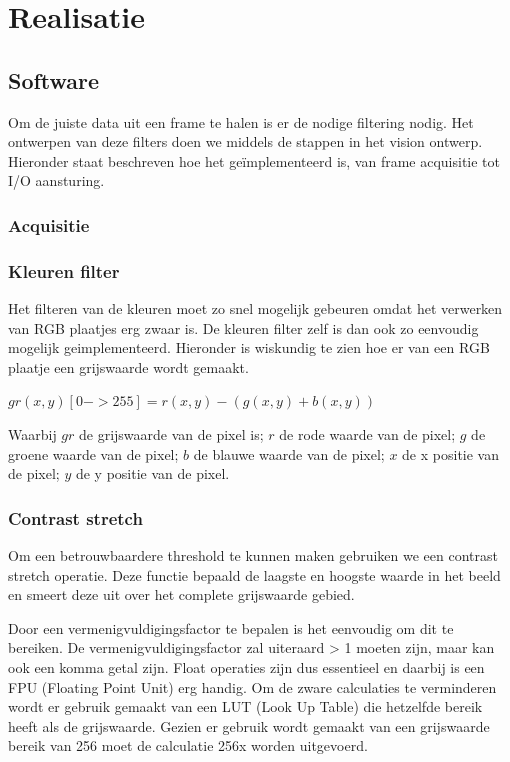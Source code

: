 \chapter{Realisatie}


\section{Software}
\label{sec:softreal}
Om de juiste data uit een frame te halen is er de nodige filtering nodig.
Het ontwerpen van deze filters doen we middels de stappen in het vision ontwerp.
Hieronder staat beschreven hoe het geïmplementeerd is, van frame acquisitie tot
I/O aansturing.

\subsection{Acquisitie}
\label{sub:acqreal}

\subsection{Kleuren filter}
\label{sub:kleurfilt}
Het filteren van de kleuren moet zo snel mogelijk gebeuren omdat het verwerken van 
RGB plaatjes erg zwaar is. De kleuren filter zelf is dan ook zo eenvoudig mogelijk 
geimplementeerd. Hieronder is wiskundig te zien hoe er van een RGB plaatje een 
grijswaarde wordt gemaakt.

$gr(x, y)[0 -> 255] = r(x, y) - (g(x, y) + b(x, y))$

Waarbij $gr$ de grijswaarde van de pixel is;
$r$ de rode waarde van de pixel;
$g$ de groene waarde van de pixel;
$b$ de blauwe waarde van de pixel;
$x$ de x positie van de pixel;
$y$ de y positie van de pixel.

\subsection{Contrast stretch}
\label{sub:contstr}
Om een betrouwbaardere threshold te kunnen maken gebruiken we een contrast stretch
operatie. Deze functie bepaald de laagste en hoogste waarde in het beeld en smeert
deze uit over het complete grijswaarde gebied.

Door een vermenigvuldigingsfactor te bepalen is het eenvoudig om dit te bereiken. De 
vermenigvuldigingsfactor zal uiteraard > 1 moeten zijn, maar kan ook een komma getal
zijn. Float operaties zijn dus essentieel en daarbij is een FPU (Floating Point Unit)
erg handig. Om de zware calculaties te verminderen wordt er gebruik gemaakt van een
LUT (Look Up Table) die hetzelfde bereik heeft als de grijswaarde. Gezien er gebruik
wordt gemaakt van een grijswaarde bereik van 256 moet de calculatie 256x worden
uitgevoerd.

